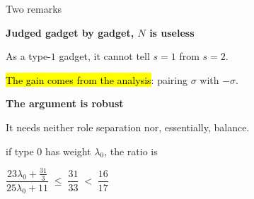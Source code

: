 \begin{frame}{Two remarks}
\vspace{1mm}
\hspace{3.5mm}%
\begin{minipage}[t]{128mm}
{\large\textbf{Judged gadget by gadget, $N$ is useless}}\hfill{}\par
\vspace{2.2mm}
\begin{minipage}[c]{70mm}\raggedright
As a type-$1$ gadget, it cannot tell $s=1$ from $s=2$.\par
\vspace{2mm}
\hl{The gain comes from the analysis}: pairing $\sigma$ with $-\sigma$.
\end{minipage}\hfill
\begin{minipage}[c]{55mm}\centering

\end{minipage}
\end{minipage}

\vspace{6mm}
\hspace{3.5mm}%
\begin{minipage}[t]{128mm}
{\large\textbf{The argument is robust}}\hfill{}\par
\vspace{2.2mm}
\begin{minipage}[c]{70mm}\raggedright
It needs neither role separation nor, essentially, balance.
\end{minipage}\hfill
\begin{minipage}[c]{55mm}\centering
{\small if type $0$ has weight $\lambda_0$, the ratio is}\par
\vspace{2.2mm}
$\dfrac{23\lambda_0+\frac{31}{3}}{25\lambda_0+11}\;\le\;\dfrac{31}{33}\;<\;\dfrac{16}{17}$
\end{minipage}
\end{minipage}
\end{frame}
